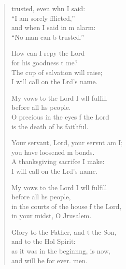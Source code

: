 \settowidth{\versewidth}{in the courts of the house of the Lord,  *}
\begin{verse}%
  \begin{patverse}
     trusted, even whn I said: \Med\\
    “I am sorely fflicted,”\\
    and when I said in m alarm: \Med\\
    “No man can b trusted.”
    
    How can I repy the Lord \Med\\
    for his goodness t me?\\
    The cup of salvation  will raise; \Med\\
    I will call on the Lrd’s name.
    
    My vows to the Lord I w\pointup{\i}ll fulfill \Med\\
    before all h\pointup{\i}s people.\\
    O precious in the eyes f the Lord \Med\\
    is the death of h\pointup{\i}s faithful.

    Your servant, Lord, your servnt am I; \Med\\
    you have loosened m bonds.\\
    A thanksgiving sacrif\pointup{\i}ce I make: \Med\\
    I will call on the Lrd’s name.

    My vows to the Lord I w\pointup{\i}ll fulfill \Med\\
    before all h\pointup{\i}s people,\\
    in the courts of the house f the Lord, \Med\\
    in your midst, O Jrusalem.

    Glory to the Father, and t the Son, \Med\\
    and to the Hol Spirit:\\
    as it was in the beginn\pointup{\i}ng, is now, \Med\\
    and will be for ever. men.
  \end{patverse}
\end{verse}
